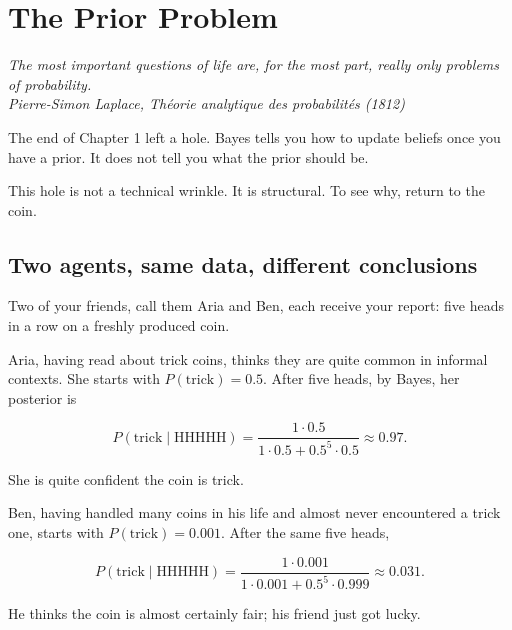 \chapter{The Prior Problem}

\vspace{1em}
\hfill
\begin{minipage}[c]{0.55\textwidth}
\raggedleft
\small\itshape
The most important questions of life are, for the most part, really only problems of probability.\\[0.5em]
\upshape\footnotesize Pierre-Simon Laplace, \textit{Th\'eorie analytique des probabilit\'es} (1812)
\end{minipage}%
\hspace{0.5em}
\begin{minipage}[c]{0.12\textwidth}
\end{minipage}
\vspace{1.5em}

\noindent The end of Chapter 1 left a hole. Bayes tells you how to update beliefs once you have a prior. It does not tell you what the prior should be.

This hole is not a technical wrinkle. It is structural. To see why, return to the coin.

\section*{Two agents, same data, different conclusions}

Two of your friends, call them Aria and Ben, each receive your report: five heads in a row on a freshly produced coin.

Aria, having read about trick coins, thinks they are quite common in informal contexts. She starts with $P(\text{trick}) = 0.5$. After five heads, by Bayes, her posterior is

$$P(\text{trick} \mid \text{HHHHH}) = \frac{1 \cdot 0.5}{1 \cdot 0.5 + 0.5^5 \cdot 0.5} \approx 0.97.$$

She is quite confident the coin is trick.

Ben, having handled many coins in his life and almost never encountered a trick one, starts with $P(\text{trick}) = 0.001$. After the same five heads,

$$P(\text{trick} \mid \text{HHHHH}) = \frac{1 \cdot 0.001}{1 \cdot 0.001 + 0.5^5 \cdot 0.999} \approx 0.031.$$

He thinks the coin is almost certainly fair; his friend just got lucky.

